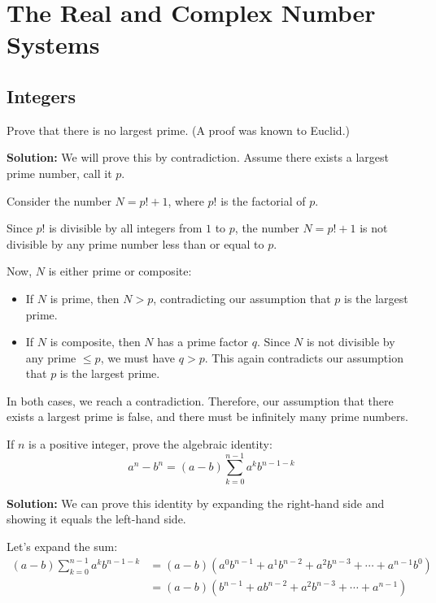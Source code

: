\chapter{The Real and Complex Number Systems}
\section{Integers}

\begin{problembox}
Prove that there is no largest prime. (A proof was known to Euclid.)
\end{problembox}

\textbf{Solution:}
We will prove this by contradiction. Assume there exists a largest prime number, call it $p$.

Consider the number $N = p! + 1$, where $p!$ is the factorial of $p$. 

Since $p!$ is divisible by all integers from $1$ to $p$, the number $N = p! + 1$ is not divisible by any prime number less than or equal to $p$.

Now, $N$ is either prime or composite:
\begin{itemize}
\item If $N$ is prime, then $N > p$, contradicting our assumption that $p$ is the largest prime.
\item If $N$ is composite, then $N$ has a prime factor $q$. Since $N$ is not divisible by any prime $\leq p$, we must have $q > p$. This again contradicts our assumption that $p$ is the largest prime.
\end{itemize}

In both cases, we reach a contradiction. Therefore, our assumption that there exists a largest prime is false, and there must be infinitely many prime numbers.

\begin{problembox}
If $n$ is a positive integer, prove the algebraic identity:
\[
a^n - b^n = (a - b)\sum_{k=0}^{n-1} a^k b^{n-1-k}
\]
\end{problembox}

\textbf{Solution:}
We can prove this identity by expanding the right-hand side and showing it equals the left-hand side.

Let's expand the sum:
\begin{align*}
(a - b)\sum_{k=0}^{n-1} a^k b^{n-1-k} &= (a - b)(a^0 b^{n-1} + a^1 b^{n-2} + a^2 b^{n-3} + \cdots + a^{n-1} b^0) \\
&= (a - b)(b^{n-1} + a b^{n-2} + a^2 b^{n-3} + \cdots + a^{n-1})
\end{align*}

